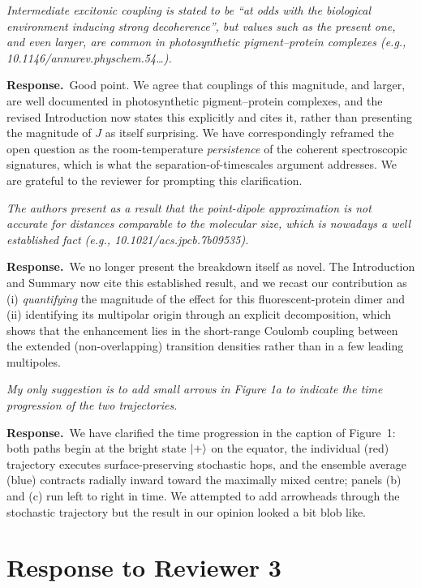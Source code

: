 \documentclass[11pt]{article}
\newcommand{\comment}[1]{\begin{revcomment}\itshape #1\end{revcomment}}
\newcommand{\response}[1]{\noindent\textbf{Response.}\ #1\par\vspace{6pt}}
\begin{document}
\comment{Intermediate excitonic coupling is stated to be ``at odds with the biological
environment inducing strong decoherence'', but values such as the present one, and even
larger, are common in photosynthetic pigment--protein complexes (e.g.,
10.1146/annurev.physchem.54\ldots).}

\response{Good point. We agree that couplings of this magnitude, and
larger, are well documented in photosynthetic pigment--protein complexes, and the
revised Introduction now states this explicitly and cites it, rather than presenting the
magnitude of $J$ as itself surprising. We have correspondingly reframed the open
question as the room-temperature \emph{persistence} of the coherent spectroscopic
signatures, which is what the separation-of-timescales argument addresses. We are
grateful to the reviewer for prompting this clarification.}

\comment{The authors present as a result that the point-dipole approximation is not
accurate for distances comparable to the molecular size, which is nowadays a well
established fact (e.g., 10.1021/acs.jpcb.7b09535).}

\response{We no longer present the breakdown itself as novel. The Introduction
and Summary now cite this established result, and we recast our contribution as (i)
\emph{quantifying} the magnitude of the effect for this fluorescent-protein dimer and
(ii) identifying its multipolar origin through an explicit decomposition, which shows
that the enhancement lies in the short-range Coulomb coupling between the extended
(non-overlapping) transition densities rather than in a few leading multipoles.}

\comment{My only suggestion is to add small arrows in Figure 1a to indicate the time
progression of the two trajectories.}

\response{We have clarified the time progression in the caption of Figure~1: both paths
begin at the bright state $\ket{+}$ on the equator, the individual (red) trajectory
executes surface-preserving stochastic hops, and the ensemble average (blue) contracts
radially inward toward the maximally mixed centre; panels (b) and (c) run left to right
in time. We attempted to add arrowheads through the stochastic trajectory but the result in our opinion looked a bit blob like.}

\newpage
\section*{Response to Reviewer 3}
\end{document}
